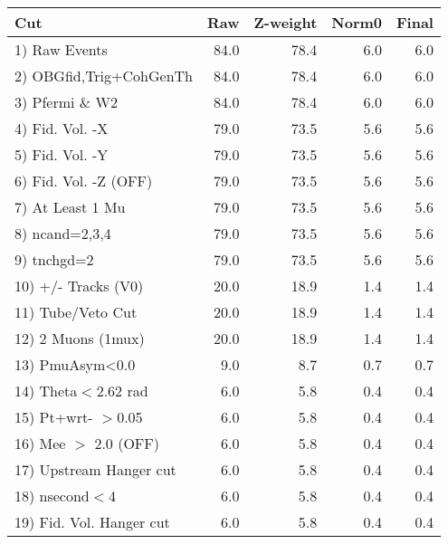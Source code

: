 \begin{table}[h!]\centering
 \begin{tabular}{||l||r|r|r|r||}
 \hline
 \hline
 Cut & Raw & Z-weight & Norm0 & Final \\
 \hline
  1) Raw Events           &        84.0 &        78.4 &         6.0 &         6.0 \\
  2) OBGfid,Trig+CohGenTh &        84.0 &        78.4 &         6.0 &         6.0 \\
  3) Pfermi \& W2         &        84.0 &        78.4 &         6.0 &         6.0 \\
  4) Fid. Vol. -X         &        79.0 &        73.5 &         5.6 &         5.6 \\
  5) Fid. Vol. -Y         &        79.0 &        73.5 &         5.6 &         5.6 \\
  6) Fid. Vol. -Z (OFF)   &        79.0 &        73.5 &         5.6 &         5.6 \\
  7) At Least 1 Mu        &        79.0 &        73.5 &         5.6 &         5.6 \\
  8) ncand=2,3,4          &        79.0 &        73.5 &         5.6 &         5.6 \\
  9) tnchgd=2             &        79.0 &        73.5 &         5.6 &         5.6 \\
 10) +/- Tracks (V0)      &        20.0 &        18.9 &         1.4 &         1.4 \\
 11) Tube/Veto Cut        &        20.0 &        18.9 &         1.4 &         1.4 \\
 12) 2 Muons (1mux)       &        20.0 &        18.9 &         1.4 &         1.4 \\
 13) PmuAsym<0.0          &         9.0 &         8.7 &         0.7 &         0.7 \\
 14) Theta$<$2.62 rad     &         6.0 &         5.8 &         0.4 &         0.4 \\
 15) Pt+wrt- $>$0.05      &         6.0 &         5.8 &         0.4 &         0.4 \\
 16) Mee $>$ 2.0  (OFF)   &         6.0 &         5.8 &         0.4 &         0.4 \\
 17) Upstream Hanger cut  &         6.0 &         5.8 &         0.4 &         0.4 \\
 18) nsecond$<$4          &         6.0 &         5.8 &         0.4 &         0.4 \\
 19) Fid. Vol. Hanger cut &         6.0 &         5.8 &         0.4 &         0.4 \\

\end{tabular}
\end{table}

